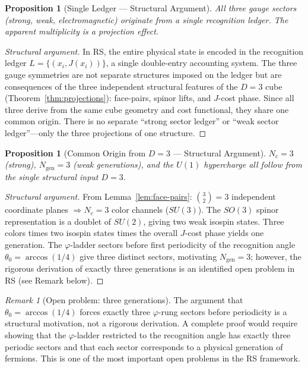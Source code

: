 \documentclass[12pt,a4paper]{article}
\newtheorem{proposition}[theorem]{Proposition}
\theoremstyle{definition}
\theoremstyle{remark}
\newtheorem{remark}[theorem]{Remark}
\begin{document}
\begin{proposition}[Single Ledger --- Structural Argument]
\label{thm:single-ledger}
All three gauge sectors (strong, weak, electromagnetic) originate
from a single recognition ledger.  The apparent multiplicity is
a projection effect.
\end{proposition}

\begin{proof}[Structural argument]
In RS, the entire physical state is encoded in the recognition ledger
$L = \{(x_i, J(x_i))\}$, a single double-entry accounting system.
The three gauge symmetries are not separate structures imposed on the
ledger but are consequences of the three independent structural
features of the $D=3$ cube (Theorem~\ref{thm:projections}):
face-pairs, spinor lifts, and $J$-cost phase.  Since all three derive
from the same cube geometry and cost functional, they share one
common origin.  There is no separate ``strong sector ledger'' or
``weak sector ledger''---only the three projections of one structure.
\end{proof}

\begin{proposition}[Common Origin from $D = 3$ --- Structural Argument]
\label{thm:common-origin}
$N_c = 3$ (strong), $N_{\mathrm{gen}} = 3$ (weak generations), and the $U(1)$
hypercharge all follow from the single structural input $D = 3$.
\end{proposition}

\begin{proof}[Structural argument]
From Lemma~\ref{lem:face-pairs}: $\binom{3}{2} = 3$ independent
coordinate planes $\Rightarrow N_c = 3$ color channels ($SU(3)$).  The $SO(3)$ spinor
representation is a doublet of $SU(2)$, giving two weak isospin states.
Three colors times two isospin states times the overall $J$-cost phase
yields one generation.  The $\varphi$-ladder sectors before first
periodicity of the recognition angle $\theta_0 = \arccos(1/4)$ give
three distinct sectors, motivating $N_{\mathrm{gen}} = 3$; however, the
rigorous derivation of exactly three generations is an identified open
problem in RS (see Remark below).
\end{proof}

\begin{remark}[Open problem: three generations]
\label{rem:3gen}
The argument that $\theta_0 = \arccos(1/4)$ forces exactly three
$\varphi$-rung sectors before periodicity is a structural motivation,
not a rigorous derivation.  A complete proof would require showing that
the $\varphi$-ladder restricted to the recognition angle has exactly
three periodic sectors and that each sector corresponds to a physical
generation of fermions.  This is one of the most important open problems
in the RS framework.
\end{remark}
\end{document}

